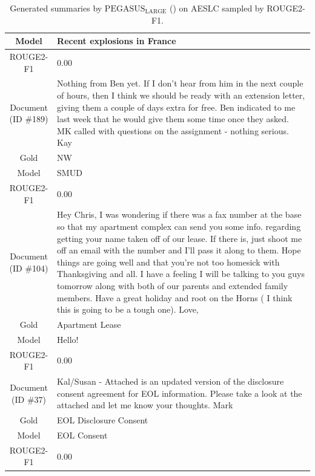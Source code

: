\begin{table}[bth!]
\begin{tabular}{c|p{}}
\\ \hline
Model & 
Recent explosions in France
\\ \hline
ROUGE2-F1 & 
0.00
\\ \hline
\makecell{Document\\(ID \#189)} & 
Nothing from Ben yet. If I don't hear from him in the next couple of hours, then I think we should be ready with an extension letter, giving them a couple of days extra for free. Ben indicated to me last week that he would give them some time once they asked. MK called with questions on the assignment - nothing serious. Kay
\\ \hline
Gold & 
NW
\\ \hline
Model & 
SMUD
\\ \hline
ROUGE2-F1 & 
0.00
\\ \hline
\makecell{Document\\(ID \#104)} & 
Hey Chris, I was wondering if there was a fax number at the base so that my apartment complex can send you some info. regarding getting your name taken off of our lease. If there is, just shoot me off an email with the number and I'll pass it along to them. Hope things are going well and that you're not too homesick with Thanksgiving and all. I have a feeling I will be talking to you guys tomorrow along with both of our parents and extended family members. Have a great holiday and root on the Horns ( I think this is going to be a tough one). Love,
\\ \hline
Gold & 
Apartment Lease
\\ \hline
Model & 
Hello!
\\ \hline
ROUGE2-F1 & 
0.00
\\ \hline
\makecell{Document\\(ID \#37)} & 
Kal/Susan - Attached is an updated version of the disclosure consent agreement for EOL information. Please take a look at the attached and let me know your thoughts. Mark
\\ \hline
Gold & 
EOL Disclosure Consent
\\ \hline
Model & 
EOL Consent
\\ \hline
ROUGE2-F1 & 
0.00
\\ \hline
\end{tabular}
\caption{Generated summaries by $\text{PEGASUS}_{\text{LARGE}}$ (\gnews) on AESLC sampled by ROUGE2-F1.}
\end{table}
